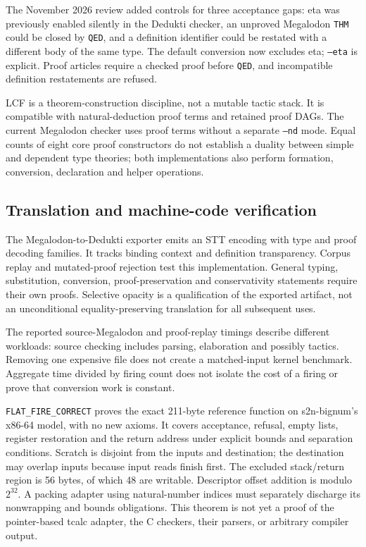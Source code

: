 \documentclass[11pt,a4paper]{article}
\theoremstyle{definition}
\begin{document}
The November 2026 review added controls for three acceptance gaps: eta was
previously enabled silently in the Dedukti checker, an unproved Megalodon
\texttt{THM} could be closed by \texttt{QED}, and a definition identifier could
be restated with a different body of the same type. The default conversion now
excludes eta; \texttt{--eta} is explicit. Proof articles require a checked proof
before \texttt{QED}, and incompatible definition restatements are refused.

LCF is a theorem-construction discipline, not a mutable tactic stack. It is
compatible with natural-deduction proof terms and retained proof DAGs. The
current Megalodon checker uses proof terms without a separate \texttt{--nd}
mode. Equal counts of eight core proof constructors do not establish a duality
between simple and dependent type theories; both implementations also perform
formation, conversion, declaration and helper operations.

\subsection{Translation and machine-code verification}
The Megalodon-to-Dedukti exporter emits an STT encoding with type and proof
decoding families. It tracks binding context and definition transparency.
Corpus replay and mutated-proof rejection test this implementation. General
typing, substitution, conversion, proof-preservation and conservativity
statements require their own proofs. Selective opacity is a qualification of
the exported artifact, not an unconditional equality-preserving translation
for all subsequent uses.

The reported source-Megalodon and proof-replay timings describe different
workloads: source checking includes parsing, elaboration and possibly tactics.
Removing one expensive file does not create a matched-input kernel benchmark.
Aggregate time divided by firing count does not isolate the cost of a firing
or prove that conversion work is constant.

\texttt{FLAT\_FIRE\_CORRECT} proves the exact 211-byte reference function on
s2n-bignum's x86-64 model, with no new axioms. It covers acceptance, refusal,
empty lists, register restoration and the return address under explicit bounds
and separation conditions. Scratch is disjoint from the inputs and destination;
the destination may overlap inputs because input reads finish first. The
excluded stack/return region is 56 bytes, of which 48 are writable. Descriptor
offset addition is modulo $2^{32}$. A packing adapter using natural-number
indices must separately discharge its nonwrapping and bounds obligations.
This theorem is not yet a proof of the pointer-based tcalc adapter, the C
checkers, their parsers, or arbitrary compiler output.
\end{document}
